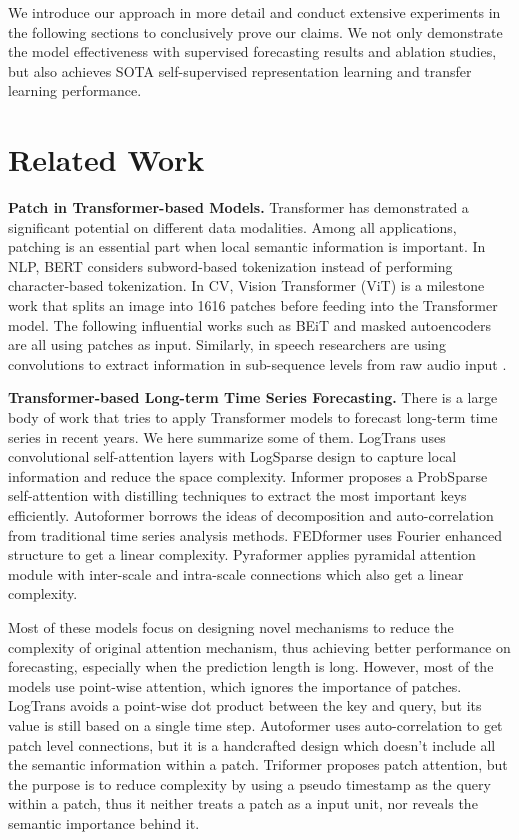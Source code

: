 \documentclass{article} \usepackage{iclr2023_conference,times}
\begin{document}
We introduce our approach in more detail and conduct extensive experiments in the following sections to conclusively prove our claims. We not only demonstrate the model effectiveness with supervised forecasting results and ablation studies, but also achieves SOTA self-supervised representation learning and transfer learning performance.



\section{Related Work}
\label{gen_inst}

\textbf{Patch in Transformer-based Models.}  Transformer \citep{transformer} has demonstrated a significant potential on different data modalities. Among all applications, patching is an essential part when local semantic information is important. In NLP, BERT \citep{bert} considers subword-based tokenization \citep{wordpiece} instead of performing character-based tokenization. In CV, Vision Transformer (ViT) \citep{vit} is a milestone work that splits an image into 1616 patches before feeding into the Transformer model. The following influential works such as BEiT \citep{beit} and masked autoencoders \citep{mae} are all using patches as input. Similarly, in speech researchers are using convolutions to extract information in sub-sequence levels from raw audio input \citep{wav2vec2,hubert}. 

\textbf{Transformer-based Long-term Time Series Forecasting.} There is a large body of work that tries to apply Transformer models to forecast long-term time series in recent years. We here summarize some of them. LogTrans \citep{logtrans} uses convolutional self-attention layers with LogSparse design to capture local information and reduce the space complexity. Informer \citep{informer} proposes a ProbSparse self-attention with distilling techniques to extract the most important keys efficiently. Autoformer \citep{autoformer} borrows the ideas of decomposition and auto-correlation from traditional time series analysis methods. FEDformer \citep{fedformer} uses Fourier enhanced structure to get a linear complexity. Pyraformer \citep{pyraformer} applies pyramidal attention module with inter-scale and intra-scale connections which also get a linear complexity.

Most of these models focus on designing novel mechanisms to reduce the complexity of original attention mechanism, thus achieving better performance on forecasting, especially when the prediction length is long. However, most of the models use point-wise attention, which ignores the importance of patches. LogTrans \citep{logtrans} avoids a point-wise dot product between the key and query, but its value is still based on a single time step. Autoformer \citep{autoformer} uses auto-correlation to get patch level connections, but it is a handcrafted design which doesn't include all the semantic information within a patch. Triformer \citep{triformer} proposes patch attention, but the purpose is to reduce complexity by using a pseudo timestamp as the query within a patch, thus it neither treats a patch as a input unit, nor reveals the semantic importance behind it.
\end{document}
